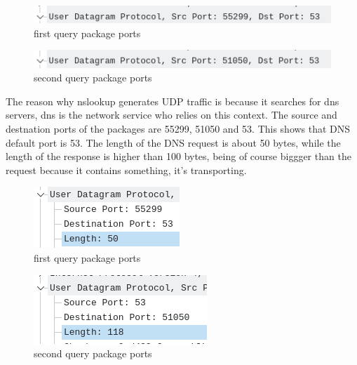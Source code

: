 \begin{figure}[htbp]
	\centering
	\includegraphics[width=1\linewidth]{img/8.png}
	\caption{first query package ports}\label{fig:8}
\end{figure}

\begin{figure}[htbp]
	\centering
	\includegraphics[width=1\linewidth]{img/9.png}
	\caption{second query package ports}\label{fig:9}
\end{figure}

The reason why nslookup generates UDP traffic is because it searches for dns servers, dns is the network service who relies on this context. The source and destnation ports of the packages are 55299, 51050 and 53. This shows that DNS default port is 53. The length of the DNS request is about 50 bytes, while the length of the response is higher than 100 bytes, being of course biggger than the request because it contains something, it's transporting.

\begin{figure}[htbp]
	\centering
	\includegraphics[width=1\linewidth]{img/10.png}
	\caption{first query package ports}\label{fig:10}
\end{figure}

\begin{figure}[htbp]
	\centering
	\includegraphics[width=1\linewidth]{img/11.png}
	\caption{second query package ports}\label{fig:11}
\end{figure}

